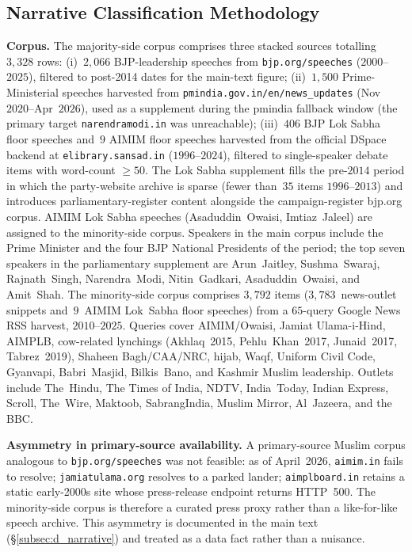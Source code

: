 

\subsection{Narrative Classification Methodology} \label{app:narrative_classification}

\textbf{Corpus.} The majority-side corpus comprises three stacked sources
totalling $3{,}328$ rows: (i)~$2{,}066$ BJP-leadership speeches from
\texttt{bjp.org/speeches} ($2000$--$2025$), filtered to post-2014 dates for
the main-text figure; (ii)~$1{,}500$ Prime-Ministerial speeches harvested
from \texttt{pmindia.gov.in/en/news\_updates} (Nov~$2020$--Apr~$2026$), used
as a supplement during the pmindia fallback window (the primary target
\texttt{narendramodi.in} was unreachable); (iii)~$406$ BJP Lok Sabha floor
speeches and~$9$ AIMIM floor speeches harvested from the official DSpace
backend at \texttt{elibrary.sansad.in} ($1996$--$2024$), filtered to
single-speaker debate items with word-count $\geq 50$. The Lok Sabha
supplement fills the pre-$2014$ period in which the party-website archive
is sparse (fewer than~$35$ items $1996$--$2013$) and introduces
parliamentary-register content alongside the campaign-register bjp.org
corpus. AIMIM Lok Sabha speeches (Asaduddin~Owaisi, Imtiaz~Jaleel) are
assigned to the minority-side corpus. Speakers in the main corpus include
the Prime Minister and the four BJP National Presidents of the period; the
top seven speakers in the parliamentary supplement are Arun~Jaitley,
Sushma~Swaraj, Rajnath~Singh, Narendra~Modi, Nitin~Gadkari,
Asaduddin~Owaisi, and Amit~Shah. The minority-side corpus comprises
$3{,}792$ items ($3{,}783$~news-outlet snippets and~$9$~AIMIM Lok~Sabha
floor speeches) from a $65$-query Google News RSS harvest, $2010$--$2025$.
Queries cover AIMIM/Owaisi, Jamiat Ulama-i-Hind, AIMPLB, cow-related
lynchings (Akhlaq~2015, Pehlu~Khan~2017, Junaid~2017, Tabrez~2019), Shaheen
Bagh/CAA/NRC, hijab, Waqf, Uniform Civil Code, Gyanvapi, Babri~Masjid,
Bilkis~Bano, and Kashmir Muslim leadership. Outlets include The~Hindu, The
Times of India, NDTV, India~Today, Indian Express, Scroll, The~Wire,
Maktoob, SabrangIndia, Muslim Mirror, Al~Jazeera, and the BBC.

\textbf{Asymmetry in primary-source availability.} A primary-source Muslim
corpus analogous to \texttt{bjp.org/speeches} was not feasible: as of
April~2026, \texttt{aimim.in} fails to resolve; \texttt{jamiatulama.org}
resolves to a parked lander; \texttt{aimplboard.in} retains a static
early-2000s site whose press-release endpoint returns HTTP~500. The
minority-side corpus is therefore a curated press proxy rather than a
like-for-like speech archive. This asymmetry is documented in the main text
(\S\ref{subsec:d_narrative}) and treated as a data fact rather than a
nuisance.

